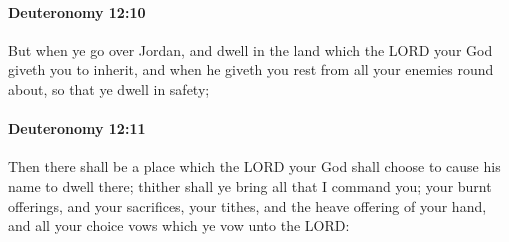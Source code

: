 		\paragraph{Deuteronomy 12:10} %
			\label{DEUTERONOMY-12-10}

			But when ye go over Jordan, and dwell in the land which the LORD your God giveth you to inherit, and when he giveth you rest from all your enemies round about, so that ye dwell in safety;


		\paragraph{Deuteronomy 12:11} %
			\label{DEUTERONOMY-12-11}

			Then there shall be a place which the LORD your God shall choose to cause his name to dwell there; thither shall ye bring all that I command you; your burnt offerings, and your sacrifices, your tithes, and the heave offering of your hand, and all your choice vows which ye vow unto the LORD:

